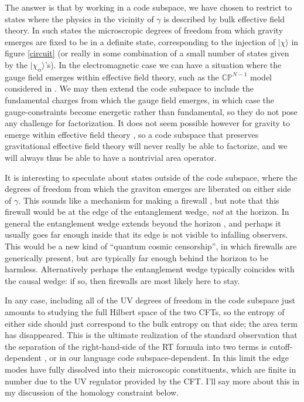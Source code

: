 \documentclass[12pt]{article}
\newcommand{\ran}{\rangle}
\begin{document}
The answer is that by working in a code subspace, we have chosen to restrict to states where the physics in the vicinity of $\gamma$ is described by bulk effective field theory.  In such states the microscropic degrees of freedom from which gravity emerges are fixed to be in a definite state, corresponding to the injection of $|\chi\ran$ in figure \ref{circuit} (or really in some combination of a small number of states given by the $|\chi_\alpha\ran$'s).  In the electromagnetic case we can have a situation where the gauge field emerges within effective field theory, such as the $\mathbb{CP}^{N-1}$ model considered in \cite{Harlow:2015lma}.  We may then extend the code subspace to include the fundamental charges from which the gauge field emerges, in which case the gauge-constraints become energetic rather than fundamental, so they do not pose any challenge for factorization.  It does not seem possible however for gravity to emerge within effective field theory \cite{Weinberg:1980kq,Marolf:2014yga}, so a code subspace that preserves gravitational effective field theory will never really be able to factorize, and we will always thus be able to have a nontrivial area operator.  

It is interesting to speculate about states outside of the code subspace, where the degrees of freedom from which the graviton emerges are liberated on either side of $\gamma$.  This sounds like a mechanism for making a firewall \cite{Almheiri:2012rt,Almheiri:2013hfa,Marolf:2013dba}, but note that this firewall would be at the edge of the entanglement wedge, \textit{not} at the horizon.  In general the entanglement wedge extends beyond the horizon \cite{Wall:2012uf,Headrick:2014cta}, and perhaps it usually goes far enough inside that its edge is not visible to infalling observers.  This would be a new kind of ``quantum cosmic censorship'', in which firewalls are generically present, but are typically far enough behind the horizon to be harmless.  Alternatively perhaps the entanglement wedge typically coincides with the causal wedge: if so, then firewalls are most likely here to stay. 

In any case, including all of the UV degrees of freedom in the code subspace just amounts to studying the full Hilbert space of the two CFTs, so the entropy of either side should just correspond to the bulk entropy on that side; the area term has disappeared. This is the ultimate realization of the standard observation that the separation of the right-hand-side of the RT formula into two terms is cutoff-dependent \cite{Solodukhin:2011gn}, or in our language code subspace-dependent.  In this limit the edge modes have fully dissolved into their microscopic constituents, which are finite in number due to the UV regulator provided by the CFT.  I'll say more about this in my discussion of the homology constraint below.
\end{document}
